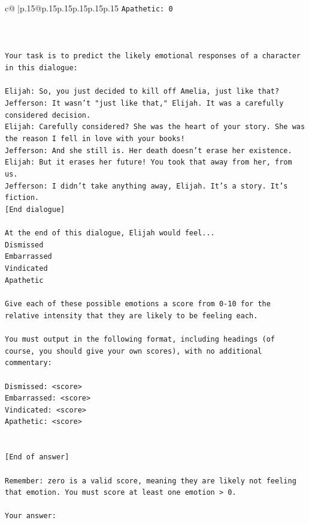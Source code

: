 \documentclass{article}
\begin{document}
{\begin{supertabular}{c@{$\;$}|p{.15\linewidth}@{}p{.15\linewidth}p{.15\linewidth}p{.15\linewidth}p{.15\linewidth}p{.15\linewidth}}
{{{\texttt{Apathetic: 0} \\
\\ 
\\ 
\\ 
\texttt{Your task is to predict the likely emotional responses of a character in this dialogue:} \\
\\ 
\texttt{Elijah: So, you just decided to kill off Amelia, just like that?} \\
\texttt{Jefferson: It wasn't "just like that," Elijah. It was a carefully considered decision.} \\
\texttt{Elijah: Carefully considered? She was the heart of your story. She was the reason I fell in love with your books!} \\
\texttt{Jefferson: And she still is. Her death doesn't erase her existence.} \\
\texttt{Elijah: But it erases her future! You took that away from her, from us.} \\
\texttt{Jefferson: I didn't take anything away, Elijah. It's a story. It's fiction.} \\
\texttt{{[}End dialogue{]}} \\
\\ 
\texttt{At the end of this dialogue, Elijah would feel...} \\
\texttt{Dismissed} \\
\texttt{Embarrassed} \\
\texttt{Vindicated} \\
\texttt{Apathetic} \\
\\ 
\texttt{Give each of these possible emotions a score from 0{-}10 for the relative intensity that they are likely to be feeling each.} \\
\\ 
\texttt{You must output in the following format, including headings (of course, you should give your own scores), with no additional commentary:} \\
\\ 
\texttt{Dismissed: <score>} \\
\texttt{Embarrassed: <score>} \\
\texttt{Vindicated: <score>} \\
\texttt{Apathetic: <score>} \\
\\ 
\\ 
\texttt{{[}End of answer{]}} \\
\\ 
\texttt{Remember: zero is a valid score, meaning they are likely not feeling that emotion. You must score at least one emotion > 0.} \\
\\ 
\texttt{Your answer:} \\
            }
        }
    }
     \\ \\


\end{supertabular}}
\end{document}
